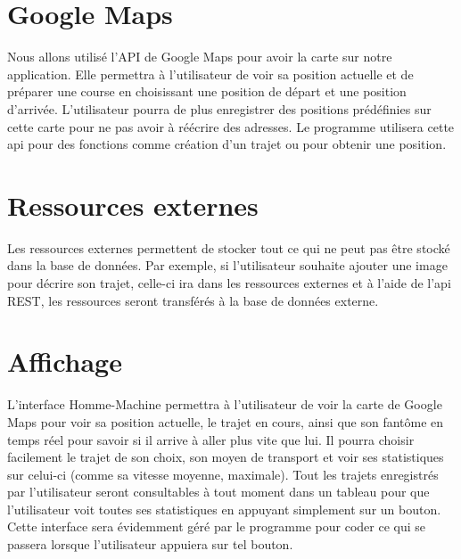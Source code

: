 \section{Google Maps}
Nous allons utilisé l'API de Google Maps pour avoir la carte sur notre application.
Elle permettra à l'utilisateur de voir sa position actuelle et de préparer une course en choisissant une position de départ et une position d'arrivée.
L'utilisateur pourra de plus enregistrer des positions prédéfinies sur cette carte pour ne pas avoir à réécrire des adresses.
Le programme utilisera cette api pour des fonctions comme création d'un trajet ou pour obtenir une position.

\section{Ressources externes}
Les ressources externes permettent de stocker tout ce qui ne peut pas être stocké dans la base de données.
Par exemple, si l'utilisateur souhaite ajouter une image pour décrire son trajet, celle-ci ira dans les ressources externes et à l'aide de l'api REST,
les ressources seront transférés à la base de données externe.

\section{Affichage}
L'interface Homme-Machine permettra à l'utilisateur de voir la carte de Google Maps pour voir sa position actuelle, le trajet en cours,
ainsi que son fantôme en temps réel pour savoir si il arrive à aller plus vite que lui.
Il pourra choisir facilement le trajet de son choix, son moyen de transport et voir ses statistiques sur celui-ci (comme sa vitesse moyenne, maximale).
Tout les trajets enregistrés par l'utilisateur seront consultables à tout moment dans un tableau pour que l'utilisateur voit toutes ses statistiques en appuyant simplement sur un bouton.
Cette interface sera évidemment géré par le programme pour coder ce qui se passera lorsque l'utilisateur appuiera sur tel bouton.